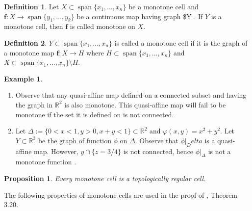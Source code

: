 \documentclass[
]{book}
\newtheorem{proposition}{Proposition}[chapter]
\theoremstyle{definition}
\newtheorem{definition}{Definition}[chapter]
\theoremstyle{definition}
\newtheorem{example}{Example}[chapter]
\theoremstyle{definition}
\theoremstyle{definition}
\theoremstyle{remark}
\begin{document}
\begin{definition}
\protect\hypertarget{def:monotone-map-on}{}\label{def:monotone-map-on}\citep[Definition 2.10]{bgv15}
Let \(X \subset {\operatorname{span} \{x_1,\ldots,x_n\}}\) be a monotone cell and \(\mathbf{f} : X \to {\operatorname{span} \{y_1,\ldots,y_k\}}\) be a continuous map having graph \$Y \subset . If \(Y\) is a monotone cell, then \(\mathbf{f}\) is called monotone on \(X\).
\end{definition}

\begin{definition}
\protect\hypertarget{def:monotone-cell}{}\label{def:monotone-cell}\citep[Definition 2.5]{bgv15}
\(Y \subset {\operatorname{span} \{x_1,\ldots,x_n\}}\) is called a monotone cell if it is the graph of a monotone map \(\mathbf{f} : X \to H\) where \(H \subset {\operatorname{span} \{x_1,\ldots,x_n\}}\) and \(X \subset {\operatorname{span} \{x_1,\ldots,x_n\}} \setminus H\).
\end{definition}

\begin{example}
\protect\hypertarget{exm:monotone-cells}{}\label{exm:monotone-cells}\leavevmode

\begin{enumerate}
\def\labelenumi{\arabic{enumi}.}
\item
  Observe that any quasi-affine map defined on a connected subset and having the graph in \(\mathbb{R}^2\) is also monotone. This quasi-affine map will fail to be monotone if the set it is defined on is not connected.
\item
  Let \(\Delta := \{ 0 < x < 1, y > 0, x + y < 1 \} \subset \mathbb{R}^2\) and \(\varphi(x,y) = x^2 + y^2\). Let \(Y \subset \mathbb{R}^3\) be the graph of function \(\phi\) on \(\Delta\). Observe that \(\phi\vert_Delta\) is a quasi-affine map. However, \(y \cap \{ z = 3/4 \}\) is not connected, hence \(\phi\vert_\Delta\) is not a monotone function \citep[Example 4.3]{bgv15}.
\end{enumerate}

\end{example}

\begin{proposition}
\protect\hypertarget{prp:monotone-topologically-regular}{}\label{prp:monotone-topologically-regular}\citep[Theorem 1]{bgv13}
Every monotone cell is a topologically regular cell.
\end{proposition}

The following properties of monotone cells are used in the proof of \citet{bgv15}, Theorem 3.20.
\end{document}

